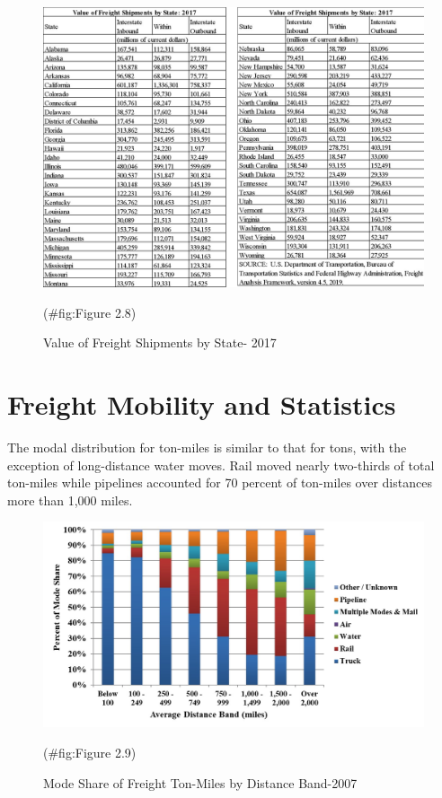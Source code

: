 \documentclass[
]{book}
\begin{document}
\begin{figure}

{\centering \includegraphics{./Images/Intro/Value of Freight Shipments by State- 2017} 

}

\caption{Value of Freight Shipments by State- 2017}(\#fig:Figure 2.8)
\end{figure}

\hypertarget{intro-Mode_Share}{%
\section{Freight Mobility and Statistics}\label{intro-Mode_Share}}

The modal distribution for ton-miles is similar to that for tons, with the exception of long-distance water moves. Rail moved nearly two-thirds of total ton-miles while pipelines accounted for 70 percent of ton-miles over distances more than 1,000 miles.

\begin{figure}

{\centering \includegraphics{./Images/Intro/Mode Share of Freight Ton-Miles by Distance Band-2007} 

}

\caption{Mode Share of Freight Ton-Miles by Distance Band-2007}(\#fig:Figure 2.9)
\end{figure}
\end{document}
